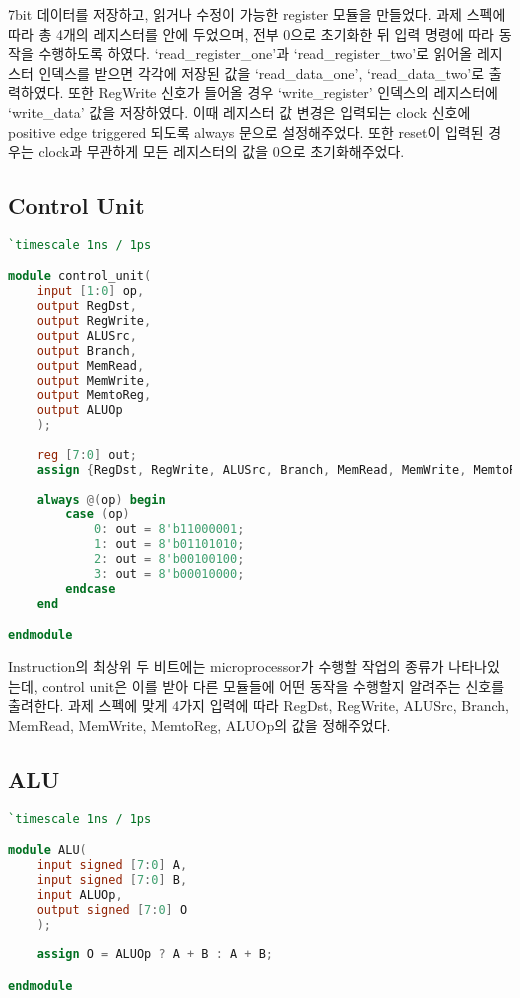 \documentclass[10pt]{article}
\begin{document}
    7bit 데이터를 저장하고, 읽거나 수정이 가능한 register 모듈을 만들었다. 
    과제 스펙에 따라 총 4개의 레지스터를 안에 두었으며, 전부 0으로 초기화한 뒤 입력 명령에 따라 동작을 수행하도록 하였다.
    `read\_register\_one'과 `read\_register\_two'로 읽어올 레지스터 인덱스를 받으면 각각에 저장된 값을 `read\_data\_one', `read\_data\_two'로 출력하였다.
    또한 RegWrite 신호가 들어올 경우 `write\_register' 인덱스의 레지스터에 `write\_data' 값을 저장하였다. 
    이때 레지스터 값 변경은 입력되는 clock 신호에 positive edge triggered 되도록 always 문으로 설정해주었다.
    또한 reset이 입력된 경우는 clock과 무관하게 모든 레지스터의 값을 0으로 초기화해주었다.

    \subsection{Control Unit}
    \begin{lstlisting}[language=Verilog, caption=control\_unit.v]
`timescale 1ns / 1ps

module control_unit(
	input [1:0] op,
	output RegDst,
	output RegWrite,
	output ALUSrc,
	output Branch,
	output MemRead,
	output MemWrite,
	output MemtoReg,
	output ALUOp
    );
	 
	reg [7:0] out;
	assign {RegDst, RegWrite, ALUSrc, Branch, MemRead, MemWrite, MemtoReg, ALUOp} = out;
	
	always @(op) begin
        case (op)
            0: out = 8'b11000001;
            1: out = 8'b01101010;
            2: out = 8'b00100100;
            3: out = 8'b00010000;
        endcase
    end

endmodule
    \end{lstlisting}

    Instruction의 최상위 두 비트에는 microprocessor가 수행할 작업의 종류가 나타나있는데, control unit은 이를 받아 다른 모듈들에 어떤 동작을 수행할지 알려주는 신호를 출려한다.
    과제 스펙에 맞게 4가지 입력에 따라 RegDst, RegWrite, ALUSrc, Branch, MemRead, MemWrite, MemtoReg, ALUOp의 값을 정해주었다.

    \subsection{ALU}
    \begin{lstlisting}[language=Verilog, caption=ALU.v]
`timescale 1ns / 1ps

module ALU(
    input signed [7:0] A,
	input signed [7:0] B,
	input ALUOp,
	output signed [7:0] O
	);
	
	assign O = ALUOp ? A + B : A + B;

endmodule
    \end{lstlisting}
\end{document}
